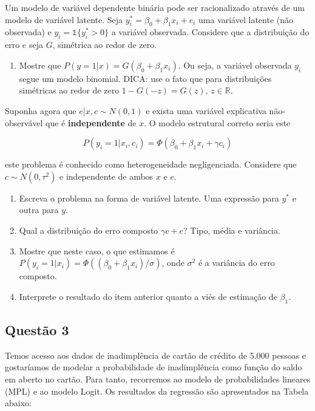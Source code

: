 \documentclass[
]{article}
\providecommand{\tightlist}{%
  \setlength{\itemsep}{0pt}\setlength{\parskip}{0pt}}
\begin{document}
Um modelo de variável dependente binária pode ser racionalizado através
de um modelo de variável latente. Seja
\(y_i^*=\beta_0 + \beta_1 x_i+e_i\) uma variável latente (não observada)
e \(y_i=\mathbb{1}\{y_i^* > 0\}\) a variável observada. Considere que a
distribuição do erro \(e\) seja \(G\), simétrica ao redor de zero.

\begin{enumerate}
\def\labelenumi{\alph{enumi})}
\tightlist
\item
  Mostre que \(P(y=1|x)=G(\beta_0 + \beta_1 x_i)\). Ou seja, a variável
  observada \(y_i\) segue um modelo binomial. DICA: use o fato que para
  distribuições simétricas ao redor de zero \(1-G(-z)=G(z)\),
  \(z\in\mathbb{R}\).
\end{enumerate}

Suponha agora que \(e|x,c \sim N(0,1)\) e exista uma variável
explicativa não-observável que é \textbf{independente} de \(x\). O
modelo estrutural correto seria este

\[P(y_i=1|x_i, c_i)=\Phi(\beta_0 + \beta_1 x_i + \gamma c_i)\]

este problema é conhecido como heterogeneidade negligenciada. Considere
que \(c\sim N(0,\tau^2)\) e independente de ambos \(x\) e \(e\).

\begin{enumerate}
\def\labelenumi{\alph{enumi})}
\setcounter{enumi}{1}
\item
  Escreva o problema na forma de variável latente. Uma expressão para
  \(y^*\) e outra para \(y\).
\item
  Qual a distribuição do erro composto \(\gamma c + e\)? Tipo, média e
  variância.
\item
  Mostre que neste caso, o que estimamos é
  \(P(y_i=1|x_i)=\Phi((\beta_0 + \beta_1 x_i)/\sigma)\), onde
  \(\sigma^2\) é a variância do erro composto.
\item
  Interprete o resultado do item anterior quanto a viés de estimação de
  \(\beta_1\).
\end{enumerate}

\hypertarget{questuxe3o-3}{%
\subsection{Questão 3}\label{questuxe3o-3}}

Temos acesso aos dados de inadimplência de cartão de crédito de 5.000
pessoas e gostaríamos de modelar a probabilidade de inadimplência como
função do saldo em aberto no cartão. Para tanto, recorremos ao modelo de
probabilidades lineares (MPL) e ao modelo Logit. Os resultados da
regressão são apresentados na Tabela abaixo:
\end{document}
